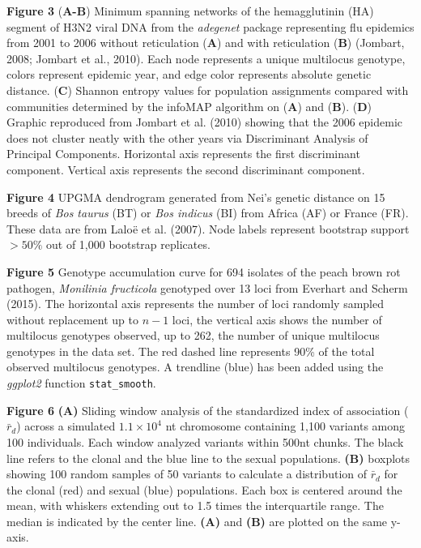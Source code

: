 \documentclass{frontiersSCNS} %
\begin{document}
\textbf{Figure 3} (\textbf{A-B}) Minimum spanning networks of the
hemagglutinin (HA) segment of H3N2 viral DNA from the \emph{adegenet}
package representing flu epidemics from 2001 to 2006 without
reticulation (\textbf{A}) and with reticulation (\textbf{B}) (Jombart,
2008; Jombart et al., 2010). Each node represents a unique multilocus
genotype, colors represent epidemic year, and edge color represents
absolute genetic distance. (\textbf{C}) Shannon entropy values for
population assignments compared with communities determined by the
infoMAP algorithm on (\textbf{A}) and (\textbf{B}). (\textbf{D}) Graphic
reproduced from Jombart et al. (2010) showing that the 2006 epidemic
does not cluster neatly with the other years via Discriminant Analysis
of Principal Components. Horizontal axis represents the first
discriminant component. Vertical axis represents the second discriminant
component.

\textbf{Figure 4} UPGMA dendrogram generated from Nei's genetic distance
on 15 breeds of \emph{Bos taurus} (BT) or \emph{Bos indicus} (BI) from
Africa (AF) or France (FR). These data are from Lalo{\"{e}} et al. (2007).
Node labels represent bootstrap support \(>50\%\) out of 1,000 bootstrap
replicates.

\textbf{Figure 5} Genotype accumulation curve for 694 isolates of the
peach brown rot pathogen, \emph{Monilinia fructicola} genotyped over 13
loci from Everhart and Scherm (2015). The horizontal axis represents the
number of loci randomly sampled without replacement up to \(n - 1\)
loci, the vertical axis shows the number of multilocus genotypes
observed, up to 262, the number of unique multilocus genotypes in the
data set. The red dashed line represents 90\% of the total observed
multilocus genotypes. A trendline (blue) has been added using the
\emph{ggplot2} function \texttt{stat\_smooth}.

\textbf{Figure 6} \textbf{(A)} Sliding window analysis of the
standardized index of association (\(\bar{r}_d\)) across a simulated
\(1.1 \times 10^4\) nt chromosome containing 1,100 variants among 100
individuals. Each window analyzed variants within 500nt chunks. The
black line refers to the clonal and the blue line to the sexual
populations. \textbf{(B)} boxplots showing 100 random samples of 50
variants to calculate a distribution of \(\bar{r}_d\) for the clonal
(red) and sexual (blue) populations. Each box is centered around the
mean, with whiskers extending out to 1.5 times the interquartile range.
The median is indicated by the center line. \textbf{(A)} and
\textbf{(B)} are plotted on the same y-axis.
\end{document}
